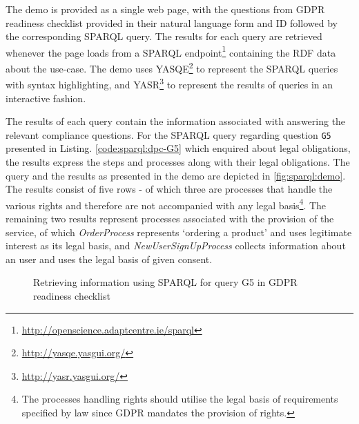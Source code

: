 The demo is provided as a single web page, with the questions from GDPR readiness checklist provided in their natural language form and ID followed by the corresponding SPARQL query.
The results for each query are retrieved whenever the page loads from a
SPARQL endpoint\footnote{\url{http://openscience.adaptcentre.ie/sparql}}
containing the RDF data about the use-case.
The demo uses YASQE\footnote{\url{http://yasqe.yasgui.org/}} to represent the SPARQL queries with syntax highlighting, and YASR\footnote{\url{http://yasr.yasgui.org/}} to represent the results of queries in an interactive fashion.

The results of each query contain the information associated with answering the relevant compliance questions. For the SPARQL query regarding question \texttt{G5} presented in Listing. \autoref{code:sparql:dpc-G5} which enquired about legal obligations, the results express the steps and processes along with their legal obligations.
The query and the results as presented in the demo are depicted in \autoref{fig:sparql:demo}.
The results consist of five rows - of which three are processes that handle the various rights and therefore are not accompanied with any legal basis\footnote{The processes handling rights should utilise the legal basis of requirements specified by law since GDPR mandates the provision of rights.}.
The remaining two results represent processes associated with the provision of the service, of which \textit{OrderProcess} represents `ordering a product' and uses legitimate interest as its legal basis, and \textit{NewUserSignUpProcess} collects information about an user and uses the legal basis of given consent.
\begin{figure}[htbp]
\centering
{}
\caption{Retrieving information using SPARQL for query G5 in GDPR readiness checklist}
\label{fig:sparql:demo}
\end{figure}


